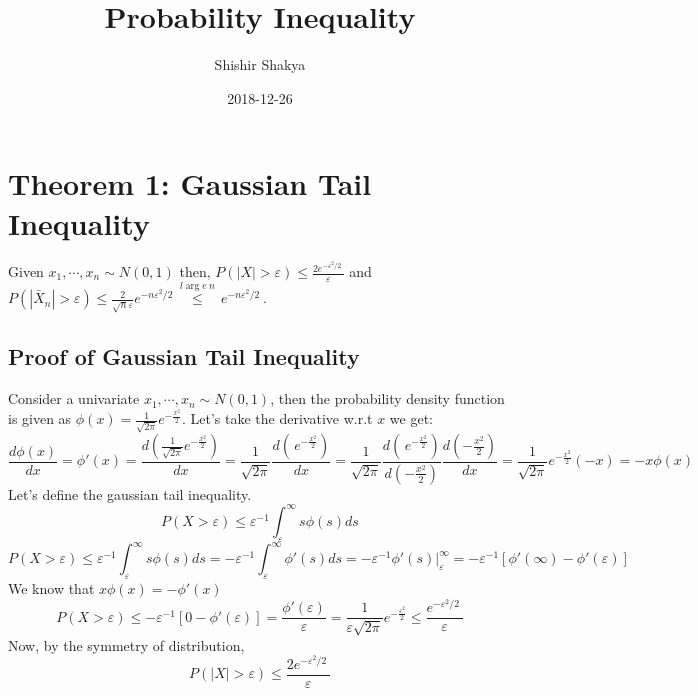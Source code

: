 \documentclass[
]{article}
\title{Probability Inequality}
\author{Shishir Shakya}
\date{2018-12-26}
\begin{document}
\maketitle

{
\setcounter{tocdepth}{2}
\tableofcontents
}
\hypertarget{theorem-1-gaussian-tail-inequality}{%
\section{Theorem 1: Gaussian Tail
Inequality}\label{theorem-1-gaussian-tail-inequality}}

Given \({{x}_{1}},\cdots ,{{x}_{n}}\sim N\left( 0,1 \right)\) then,
\(P\left( \left| X \right|>\varepsilon \right)\le \frac{2{{e}^{-{{{\varepsilon }^{2}}}/{2}\;}}}{\varepsilon }\)
and
\(P\left( \left| {{{\bar{X}}}_{n}} \right|>\varepsilon \right)\le \frac{2}{\sqrt{n}\varepsilon }{{e}^{-{n{{\varepsilon }^{2}}}/{2}\;}}\overset{l\arg e\ n}{\mathop{\le }}\,{{e}^{-{n{{\varepsilon }^{2}}}/{2}\;}}\).

\hypertarget{proof-of-gaussian-tail-inequality}{%
\subsection{Proof of Gaussian Tail
Inequality}\label{proof-of-gaussian-tail-inequality}}

Consider a univariate
\({{x}_{1}},\cdots ,{{x}_{n}}\sim N\left( 0,1 \right)\), then the
probability density function is given as
\(\phi \left( x \right)=\frac{1}{\sqrt{2\pi }}{{e}^{-\frac{{{x}^{2}}}{2}}}\).
Let's take the derivative w.r.t \(x\) we get:
\[\frac{d\phi \left( x \right)}{dx}={\phi }'\left( x \right)=\frac{d\left( \frac{1}{\sqrt{2\pi }}{{e}^{-\frac{{{x}^{2}}}{2}}} \right)}{dx}=\frac{1}{\sqrt{2\pi }}\frac{d\left( \,{{e}^{-\frac{{{x}^{2}}}{2}}} \right)}{dx}=\frac{1}{\sqrt{2\pi }}\frac{d\left( \,{{e}^{-\frac{{{x}^{2}}}{2}}} \right)}{d\left( -\frac{{{x}^{2}}}{2} \right)}\frac{d\left( -\frac{{{x}^{2}}}{2} \right)}{dx}=\frac{1}{\sqrt{2\pi }}{{e}^{-\frac{{{x}^{2}}}{2}}}\left( -x \right)=-x\phi \left( x \right)\]
Let's define the gaussian tail inequality.
\[P\left( X>\varepsilon  \right)\le {{\varepsilon }^{-1}}\int_{\varepsilon }^{\infty }{s\phi \left( s \right)ds}\]
\[P\left( X>\varepsilon  \right)\le {{\varepsilon }^{-1}}\int_{\varepsilon }^{\infty }{s\phi \left( s \right)ds}=-{{\varepsilon }^{-1}}\int_{\varepsilon }^{\infty }{{\phi }'\left( s \right)ds}=-{{\varepsilon }^{-1}}\left. {\phi }'\left( s \right) \right|_{\varepsilon }^{\infty }=-{{\varepsilon }^{-1}}\left[ {\phi }'\left( \infty  \right)-{\phi }'\left( \varepsilon  \right) \right]\]
We know that \(x\phi \left( x \right)=-{\phi }'\left( x \right)\)
\[P\left( X>\varepsilon  \right)\le -{{\varepsilon }^{-1}}\left[ 0-{\phi }'\left( \varepsilon  \right) \right]=\frac{{\phi }'\left( \varepsilon  \right)}{\varepsilon }=\frac{1}{\varepsilon \sqrt{2\pi }}{{e}^{-\frac{{{\varepsilon }^{2}}}{2}}}\le \frac{{{e}^{-{{{\varepsilon }^{2}}}/{2}\;}}}{\varepsilon }\]
Now, by the symmetry of distribution,
\[P\left( \left| X \right|>\varepsilon  \right)\le \frac{2{{e}^{-{{{\varepsilon }^{2}}}/{2}\;}}}{\varepsilon }\]
\end{document}
